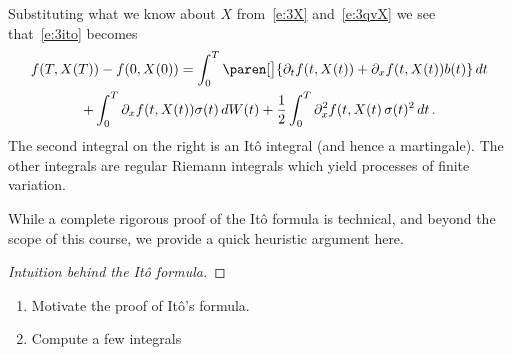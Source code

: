 \begin{remark}
  Substituting what we know about $X$ from~\eqref{e:3X} and~\eqref{e:3qvX} we see that~\eqref{e:3ito} becomes
  \begin{multline*}
    f(T, X(T)) - f(0, X(0))
      = \int_0^T \paren[\big]{ \partial_t f( t, X(t) )
	+ \partial_x f(t, X(t) ) b(t)} \, dt
    \\
      \mathbin+ \int_0^T \partial_x f(t, X(t)) \sigma(t) \, dW(t)
	+ \frac{1}{2} \int_0^T \partial_x^2 f(t, X(t) \, \sigma(t)^2 \, dt\,.
  \end{multline*}
  The second integral on the right is an It\^o integral (and hence a martingale).
  The other integrals are regular Riemann integrals which yield processes of finite variation.
\end{remark}

While a complete rigorous proof of the It\^o formula is technical, and beyond the scope of this course, we provide a quick heuristic argument here.

\begin{proof}[Intuition behind the It\^o formula]
\end{proof}

\begin{todo}
\begin{enumerate}
  \item Motivate the proof of It\^o's formula.
  \item Compute a few integrals
\end{enumerate}
\end{todo}

